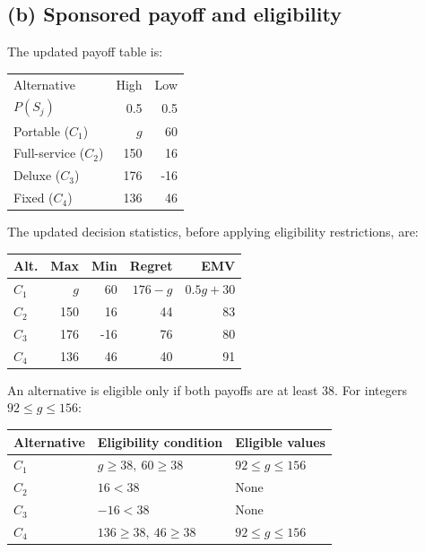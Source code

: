 \label{sol:q2b}
\subsection*{(b) Sponsored payoff and eligibility }

The updated payoff table is:

\begin{center}\small\setlength{\tabcolsep}{4pt}
	\begin{tabular}{lrr}\toprule
		Alternative & High & Low\\
		$P(S_j)$ & 0.5 & 0.5\\ \midrule
				Portable ($C_1$) & $g$ & 60\\
		Full-service ($C_2$) & 150 & 16\\
		Deluxe ($C_3$) & 176 & -16\\
		Fixed ($C_4$) & 136 & 46\\
		\bottomrule
	\end{tabular}
\end{center}

The updated decision statistics, before applying
eligibility restrictions, are:

\begin{center}\small\setlength{\tabcolsep}{4pt}
	\begin{tabular}{lrrrr}\toprule
		Alt. & Max & Min & Regret & EMV\\ \midrule
				$C_1$ & $g$ & 60 & $176-g$ & $0.5g+30$\\
		$C_2$ & 150 & 16 & 44 & 83\\
		$C_3$ & 176 & -16 & 76 & 80\\
		$C_4$ & 136 & 46 & 40 & 91\\
		\bottomrule
	\end{tabular}
\end{center}

An alternative is eligible only if both payoffs
are at least 38. For integers $92\le g\le156$:

\begin{center}
\begin{tabular}{lll}\toprule
Alternative & Eligibility condition & Eligible values\\\midrule
$C_1$ & $g\ge38,\ 60\ge38$ & $92\le g\le156$\\
$C_2$ & $16<38$ & None\\
$C_3$ & $-16<38$ & None\\
$C_4$ & $136\ge38,\ 46\ge38$ & $92\le g\le156$\\
\bottomrule
\end{tabular}
\end{center}

